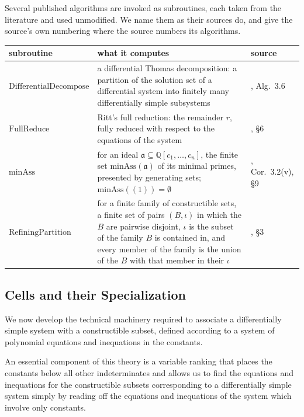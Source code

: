 \documentclass{article}
\theoremstyle{definition}
\theoremstyle{plain}
\begin{document}
Several published algorithms are invoked as subroutines, each taken from the
literature and used unmodified.
We name them as their sources do, and give the
source's own numbering where the source numbers its algorithms.

\begin{center}
\small
\begin{tabularx}{\textwidth}{@{}lXl@{}}
\hline
subroutine & what it computes & source \\
\hline
$\mathrm{DifferentialDecompose}$
  & a differential Thomas decomposition: a partition of the solution set of a
    differential system into finitely many differentially simple subsystems
  & \cite{ThomasDecomp}, Alg.~3.6 \\[3pt]
$\mathrm{FullReduce}$
  & Ritt's full reduction: the remainder $r$, fully reduced with respect to the
    equations of the system
  & \cite{Ritt}, \S6 \\[3pt]
$\mathrm{minAss}$
  & for an ideal $\mathfrak{a} \subseteq \mathbb{Q}[c_1, \ldots, c_n]$, the
    finite set $\mathrm{minAss}(\mathfrak{a})$ of its minimal primes,
    presented by generating sets; $\mathrm{minAss}((1)) = \emptyset$
  & \cite{GTZ}, Cor.~3.2(v), \S9 \\[3pt]
$\mathrm{RefiningPartition}$
  & for a finite family of constructible sets, a finite set of pairs
    $(B, \iota)$ in which the $B$ are pairwise disjoint, $\iota$ is the
    subset of the family $B$ is contained in, and every member of the family
    is the union of the $B$ with that member in their $\iota$
  & \cite{CSTools}, \S3 \\[3pt]
\hline
\end{tabularx}
\end{center}

\subsection{Cells and their Specialization}
\label{sec:cells-specialization}

We now develop the technical machinery required to associate
a differentially simple system with a constructible subset, defined according to a system
of polynomial equations and inequations in the constants.

An essential component of this theory is a variable ranking
that places the constants below all other indeterminates and
allows us to find the equations and inequations for the constructible subsets corresponding to a differentially
simple system simply by reading off the equations and inequations of the system
which involve only constants.
\end{document}
